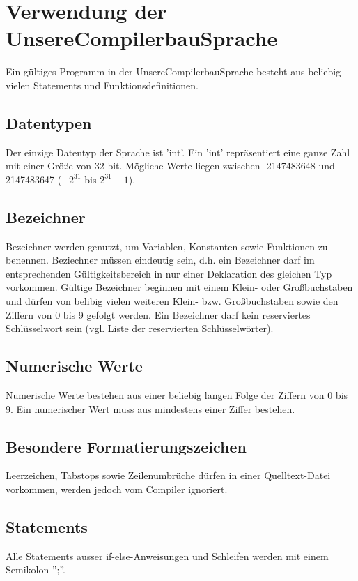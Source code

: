 
\section{Verwendung der UnsereCompilerbauSprache}
Ein gültiges Programm in der UnsereCompilerbauSprache besteht aus beliebig vielen Statements und Funktionsdefinitionen. 

\subsection{Datentypen}
Der einzige Datentyp der Sprache ist 'int'. Ein 'int' repräsentiert eine ganze Zahl mit einer Größe von 32 bit. Mögliche Werte liegen zwischen -2147483648 und 2147483647 ($-2^{31}$ bis $2^{31} - 1$).

\subsection{Bezeichner}
Bezeichner werden genutzt, um Variablen, Konstanten sowie Funktionen zu benennen.
Beziechner müssen eindeutig sein, d.h. ein Bezeichner darf im entsprechenden Gültigkeitsbereich in nur einer Deklaration des gleichen Typ vorkommen. Gültige Bezeichner beginnen mit einem Klein- oder Großbuchstaben und dürfen von belibig vielen weiteren Klein- bzw. Großbuchstaben sowie den Ziffern von 0 bis 9 gefolgt werden. Ein Bezeichner darf kein reserviertes Schlüsselwort sein (vgl. Liste der reservierten Schlüsselwörter).

\subsection{Numerische Werte}
Numerische Werte bestehen aus einer beliebig langen Folge der Ziffern von 0 bis 9. Ein numerischer Wert muss aus mindestens einer Ziffer bestehen.

\subsection{Besondere Formatierungszeichen} 
Leerzeichen, Tabstops sowie Zeilenumbrüche dürfen in einer Quelltext-Datei vorkommen, werden jedoch vom Compiler ignoriert.


\subsection{Statements}
Alle Statements ausser if-else-Anweisungen und Schleifen werden mit einem Semikolon '';''.


